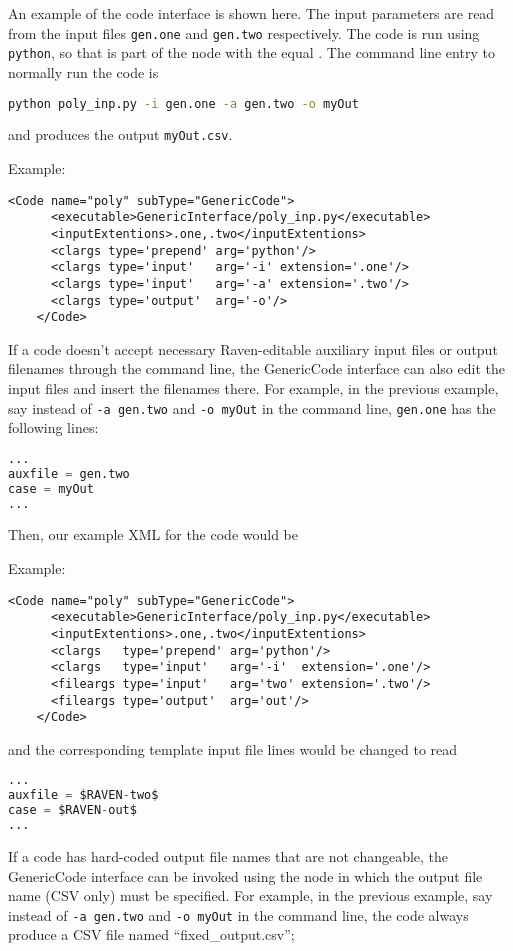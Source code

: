  An example of the code interface is shown here.  The input parameters are read
 from the input files \texttt{gen.one} and \texttt{gen.two} respectively.
 The code is run using \texttt{python}, so that is part of the  node with the  equal .
 The command line entry to normally run the code is
\begin{lstlisting}[language=bash]
python poly_inp.py -i gen.one -a gen.two -o myOut
\end{lstlisting}
and produces the output \texttt{myOut.csv}.

Example:
\begin{lstlisting}[style=XML]
    <Code name="poly" subType="GenericCode">
      <executable>GenericInterface/poly_inp.py</executable>
      <inputExtentions>.one,.two</inputExtentions>
      <clargs type='prepend' arg='python'/>
      <clargs type='input'   arg='-i' extension='.one'/>
      <clargs type='input'   arg='-a' extension='.two'/>
      <clargs type='output'  arg='-o'/>
    </Code>
\end{lstlisting}

If a code doesn't accept necessary Raven-editable auxiliary input files
or output filenames through the command line, the GenericCode interface
can also edit the input files and insert the filenames there.  For example,
in the previous example, say instead of \texttt{-a gen.two} and \texttt{-o myOut}
in the command line, \texttt{gen.one} has the following lines:
\begin{lstlisting}[language=python]
...
auxfile = gen.two
case = myOut
...
\end{lstlisting}
Then, our example XML for the code would be

Example:
\begin{lstlisting}[style=XML]
    <Code name="poly" subType="GenericCode">
      <executable>GenericInterface/poly_inp.py</executable>
      <inputExtentions>.one,.two</inputExtentions>
      <clargs   type='prepend' arg='python'/>
      <clargs   type='input'   arg='-i'  extension='.one'/>
      <fileargs type='input'   arg='two' extension='.two'/>
      <fileargs type='output'  arg='out'/>
    </Code>
\end{lstlisting}
and the corresponding template input file lines would be changed to read
\begin{lstlisting}[language=python]
...
auxfile = $RAVEN-two$
case = $RAVEN-out$
...
\end{lstlisting}


If a code has hard-coded output file names that are not changeable,
the GenericCode interface can be invoked using the 
node in which the output file name (CSV only) must be specified.
For example, in the previous example, say instead of \texttt{-a gen.two} and \texttt{-o myOut}
in the command line, the code always produce a CSV file named ``fixed\_output.csv'';

